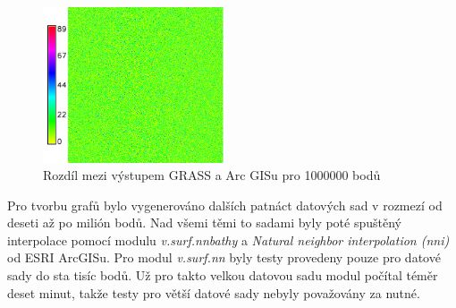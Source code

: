 \documentclass[12pt,a4paper]{article}
\begin{document}
\newpage
\begin{figure}[h!]
\centering
\begin{floatrow}
\end{floatrow}
\end{figure}

\begin{figure}[h!]
\centering
\includegraphics[width=0.48\textwidth]{img/diff_mil.png}
\caption{Rozdíl mezi výstupem GRASS a Arc GISu pro 1000000 bodů}
\label{fig:dif_mil}
\end{figure}

\newpage
Pro tvorbu grafů bylo vygenerováno dalších patnáct datových sad v rozmezí od deseti až po milión bodů. Nad všemi těmi to sadami byly poté spuštěný interpolace pomocí modulu \emph{v.surf.nnbathy} a \emph{Natural neighbor interpolation (nni)} od ESRI Arc\-GISu. Pro modul \emph{v.surf.nn} byly testy provedeny pouze pro datové sady do sta tisíc bodů. Už pro takto velkou datovou sadu modul počítal téměr deset minut, takže testy pro větší datové sady nebyly považovány za nutné.
\end{document}
